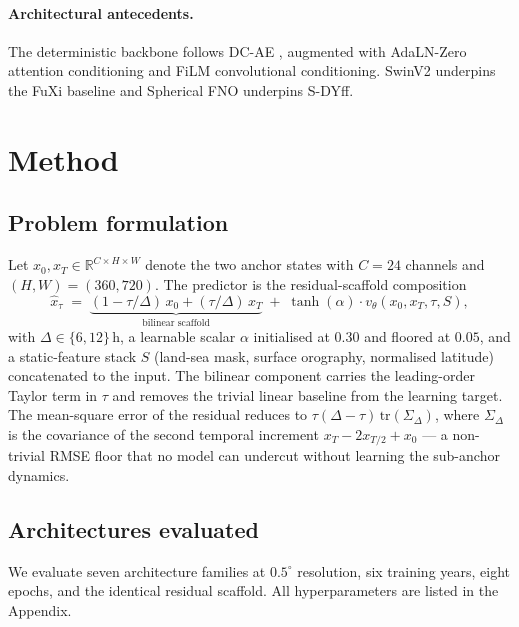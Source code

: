 \documentclass[10pt,letterpaper,twocolumn]{article}
\begin{document}
\paragraph{Architectural antecedents.}
The deterministic backbone follows DC-AE \cite{xie2024dcae,cai2024dcae},
augmented with AdaLN-Zero \cite{peebles2023dit,esser2024sd3}
attention conditioning and FiLM convolutional conditioning. SwinV2
\cite{liu2022swinv2} underpins the FuXi baseline and Spherical FNO
\cite{bonev2023sfno} underpins S-DYff.

\section{Method}
\label{sec:method}

\subsection{Problem formulation}

Let $x_0, x_T \in \mathbb{R}^{C \times H \times W}$ denote the two
anchor states with $C{=}24$ channels and $(H, W){=}(360, 720)$. The
predictor is the residual-scaffold composition
\begin{equation}
\hat{x}_\tau \;=\;
\underbrace{(1-\tau/\Delta)\,x_0 + (\tau/\Delta)\,x_T}_{\text{bilinear scaffold}}
\;+\; \tanh(\alpha)\cdot v_\theta(x_0, x_T, \tau, S),
\label{eq:scaffold}
\end{equation}
with $\Delta \in \{6, 12\}\,$h, a learnable scalar $\alpha$ initialised
at $0.30$ and floored at $0.05$, and a static-feature stack
$S$ (land-sea mask, surface orography, normalised latitude) concatenated
to the input. The bilinear component carries the leading-order Taylor
term in $\tau$ and removes the trivial linear baseline from the learning
target. The mean-square error of the residual reduces to
$\tau(\Delta{-}\tau)\,\mathrm{tr}(\Sigma_\Delta)$, where $\Sigma_\Delta$
is the covariance of the second temporal increment
$x_T - 2 x_{T/2} + x_0$ \cite{karatzas1991brownian} --- a non-trivial
RMSE floor that no model can undercut without learning the
sub-anchor dynamics.

\subsection{Architectures evaluated}

We evaluate seven architecture families at $0.5^\circ$ resolution, six
training years, eight epochs, and the identical residual scaffold. All
hyperparameters are listed in the Appendix.
\end{document}
